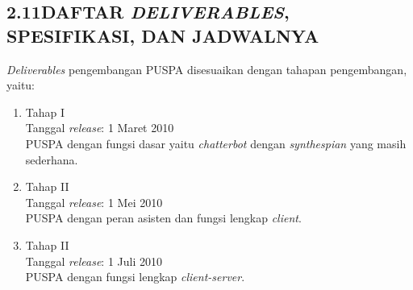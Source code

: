 \subsection*{\textsf{\normalsize 2.11\hspace{0.5cm}DAFTAR \textit{DELIVERABLES}, SPESIFIKASI, DAN JADWALNYA}}

\textit{Deliverables} pengembangan PUSPA disesuaikan dengan tahapan pengembangan, yaitu:
\begin{enumerate}
	\item Tahap I\\
	Tanggal \textit{release}: 1 Maret 2010\\
	PUSPA dengan fungsi dasar yaitu \textit{chatterbot} dengan \textit{synthespian} yang masih sederhana.
	\item Tahap II\\
	Tanggal \textit{release}: 1 Mei 2010\\
	PUSPA dengan peran asisten dan fungsi lengkap \textit{client}.
	\item Tahap II\\
	Tanggal \textit{release}: 1 Juli 2010\\
	PUSPA dengan fungsi lengkap \textit{client-server}.
\end{enumerate}
